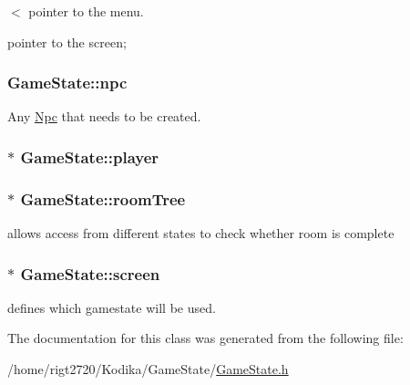 $<$ pointer to the menu. 

pointer to the screen; \hypertarget{classGameState_abad6c7ef24903f67494ae659af9f0e9e}{
\subsubsection[{npc}]{ Game\-State\-::npc\hspace{0.3cm}{\ttfamily [protected]}}}\label{classGameState_abad6c7ef24903f67494ae659af9f0e9e}


Any \hyperlink{classNpc}{Npc} that needs to be created. 

\hypertarget{classGameState_a580b319e1866f1bb79328c7d09581bdf}{
\subsubsection[{player}]{$\ast$ Game\-State\-::player\hspace{0.3cm}{\ttfamily [protected]}}}\label{classGameState_a580b319e1866f1bb79328c7d09581bdf}
\hypertarget{classGameState_acf694139ba8388f8258eeffdb75f0c3b}{
\subsubsection[{room\-Tree}]{$\ast$ Game\-State\-::room\-Tree\hspace{0.3cm}{\ttfamily [protected]}}}\label{classGameState_acf694139ba8388f8258eeffdb75f0c3b}


allows access from different states to check whether room is complete 

\hypertarget{classGameState_a877c0c626d54802e54e876a56dc6603b}{
\subsubsection[{screen}]{$\ast$ Game\-State\-::screen\hspace{0.3cm}{\ttfamily [protected]}}}\label{classGameState_a877c0c626d54802e54e876a56dc6603b}


defines which gamestate will be used. 



The documentation for this class was generated from the following file\-:\begin{DoxyCompactItemize}
\item 
/home/rigt2720/\-Kodika/\-Game\-State/\hyperlink{GameState_8h}{Game\-State.\-h}\end{DoxyCompactItemize}
